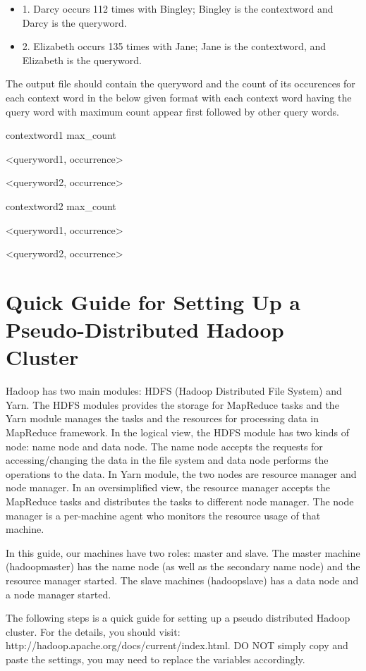 \documentclass[11pt]{article}
\begin{document}
\begin{itemize}
\item 1. Darcy occurs 112 times with Bingley; Bingley is the contextword and Darcy is the queryword.

\item 2. Elizabeth occurs 135 times with Jane; Jane is the contextword, and Elizabeth is the queryword.
\end{itemize}
The output file should contain the queryword and the count of its occurences for each context word in the below given format with each context word having the query word with maximum count appear first followed by other query words.

contextword1 max\_count

\textless queryword1, occurrence\textgreater

\textless queryword2, occurrence\textgreater

contextword2 max\_count

\textless queryword1, occurrence\textgreater

\textless queryword2, occurrence\textgreater






\section*{Quick Guide for Setting Up a Pseudo-Distributed Hadoop Cluster}
Hadoop has two main modules: HDFS (Hadoop Distributed File System) and Yarn. The HDFS modules provides the storage for MapReduce tasks and the Yarn module manages the tasks and the resources for processing data in MapReduce framework. In the logical view, the HDFS module has two kinds of node: name node and data node. The name node accepts the requests for accessing/changing the data in the file system and data node performs the operations to the data. In Yarn module, the two nodes are resource manager and node manager. In an oversimplified view, the resource manager accepts the MapReduce tasks and distributes the tasks to different node manager. The node manager is a per-machine agent who monitors the resource usage of that machine.

In this guide, our machines have two roles: master and slave. The master machine (hadoopmaster) has the name node (as well as the secondary name node) and the resource manager started. The slave machines (hadoopslave) has a data node and a node manager started.

The following steps is a quick guide for setting up a pseudo distributed Hadoop cluster. For the details, you should visit: http://hadoop.apache.org/docs/current/index.html. DO NOT simply copy and paste the settings, you may need to replace the variables accordingly.
\end{document}
